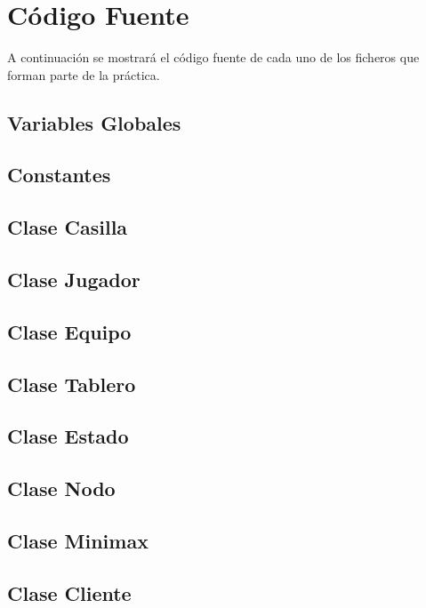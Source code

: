 \chapter {Código Fuente}

A continuación se mostrará el código fuente de cada uno de los
ficheros que forman parte de la práctica.
\section {Variables Globales}
\texttt{}

\section {Constantes}
\texttt{}

\section {Clase Casilla}
\texttt{}

\section {Clase Jugador}
\texttt{}

\section {Clase Equipo}
\texttt{}

\section {Clase Tablero}
\label{clasetablero}
\texttt{}

\section {Clase Estado}
\texttt{}

\section {Clase Nodo}
\texttt{}

\section {Clase Minimax}
\texttt{}

\section {Clase Cliente}
\texttt{}
